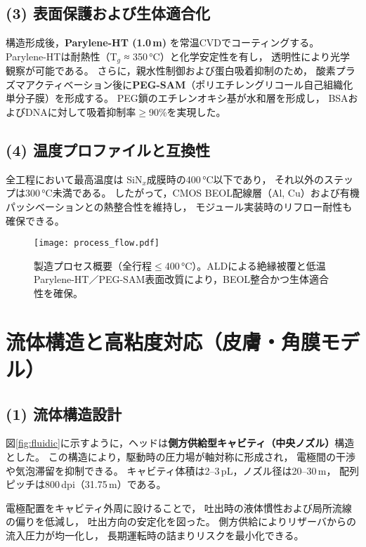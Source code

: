\documentclass[conference]{IEEEtran}
\begin{document}
\subsection*{(3) 表面保護および生体適合化}
構造形成後，\textbf{Parylene-HT (1.0\,\textmu m)} を常温CVDでコーティングする。
Parylene-HTは耐熱性（T$_g$ ≈ 350\,\si{\celsius}）と化学安定性を有し，
透明性により光学観察が可能である。
さらに，親水性制御および蛋白吸着抑制のため，
酸素プラズマアクティベーション後に\textbf{PEG-SAM}（ポリエチレングリコール自己組織化単分子膜）を形成する。
PEG鎖のエチレンオキシ基が水和層を形成し，
BSAおよびDNAに対して吸着抑制率$\ge$90\%を実現した。

\subsection*{(4) 温度プロファイルと互換性}
全工程において最高温度は
SiN$_x$成膜時の400\,\si{\celsius}以下であり，
それ以外のステップは300\,\si{\celsius}未満である。
したがって，CMOS BEOL配線層（Al, Cu）および有機パッシベーションとの熱整合性を維持し，
モジュール実装時のリフロー耐性も確保できる。

\begin{figure}[t]
\centering
\texttt{[image: process\_flow.pdf]}
\caption{製造プロセス概要（全行程$\le$400\,\si{\celsius}）。ALDによる絶縁被覆と低温Parylene-HT／PEG-SAM表面改質により，BEOL整合かつ生体適合性を確保。}
\label{fig:process}
\end{figure}

\section{流体構造と高粘度対応（皮膚・角膜モデル）}

\subsection*{(1) 流体構造設計}
図\ref{fig:fluidic}に示すように，ヘッドは\textbf{側方供給型キャビティ（中央ノズル）}構造とした。
この構造により，駆動時の圧力場が軸対称に形成され，
電極間の干渉や気泡滞留を抑制できる。
キャビティ体積は2--3\,pL，ノズル径は20--30\,\textmu m，
配列ピッチは800\,dpi（31.75\,\textmu m）である。

電極配置をキャビティ外周に設けることで，
吐出時の液体慣性および局所流線の偏りを低減し，
吐出方向の安定化を図った。
側方供給によりリザーバからの流入圧力が均一化し，
長期運転時の詰まりリスクを最小化できる。
\end{document}
